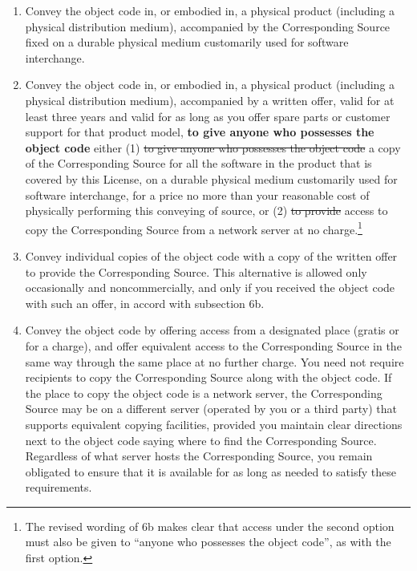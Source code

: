 \documentclass[11pt]{article}
\newcounter{v2section}
\newcounter{v3section}
\begin{document}
\begin{enumerate}

\renewcommand{\labelenumi}{\alph{enumi})}

\item 

    Convey the object code in, or embodied in, a physical product
    (including a physical distribution medium), accompanied by the
    Corresponding Source fixed on a durable physical medium customarily
    used for software interchange.

\item 

    Convey the object code in, or embodied in, a physical product
    (including a physical distribution medium), accompanied by a written
    offer, valid for at least three years and valid for as long as you
    offer spare parts or customer support for that product model,
    \textbf{to give anyone who possesses the object code} either (1)
    \sout{to give anyone who possesses the object code} a copy of the
    Corresponding Source for all the software in the product that is
    covered by this License, on a durable physical medium customarily
    used for software interchange, for a price no more than your
    reasonable cost of physically performing this conveying of source,
    or (2) \sout{to provide} access to copy the Corresponding Source
    from a network server at no charge.\footnote{The revised wording of
    6b makes clear that access under the second option must also be
    given to ``anyone who possesses the object code'', as with the first
    option.}

\item 

    Convey individual copies of the object code with a copy of the
    written offer to provide the Corresponding Source.  This alternative
    is allowed only occasionally and noncommercially, and only if you
    received the object code with such an offer, in accord with
    subsection 6b.

\item 

    Convey the object code by offering access from a designated place
    (gratis or for a charge), and offer equivalent access to the
    Corresponding Source in the same way through the same place at no
    further charge.  You need not require recipients to copy the
    Corresponding Source along with the object code. If the place to
    copy the object code is a network server, the Corresponding Source
    may be on a different server (operated by you or a third party) that
    supports equivalent copying facilities, provided you maintain clear
    directions next to the object code saying where to find the
    Corresponding Source. Regardless of what server hosts the
    Corresponding Source, you remain obligated to ensure that it is
    available for as long as needed to satisfy these requirements.


\end{enumerate}
\end{document}
